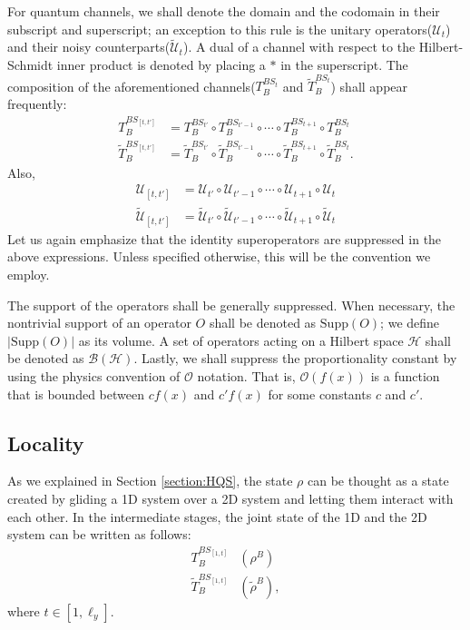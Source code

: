 \documentclass[prx,aps,amsmath,amssymb,floatfix,superscriptaddress,11pt,tightenlines,longbibliography,onecolumn,notitlepage]{revtex4-1}
\newcommand{\tran}[1]{T_{B}^{BS_{#1}}}
\newcommand{\trant}[2]{T_{B}^{BS_{[#1 , #2]}}}
\newcommand{\ttran}[1]{\tilde{T}_{B}^{BS_{#1}}}
\newcommand{\ttrant}[2]{\tilde{T}_{B}^{BS_{[#1 , #2]}}}
\newcommand{\U}[2]{\mathcal{U}_{[#1, #2]}}
\newcommand{\tU}[2]{\tilde{\mathcal{U}}_{[#1, #2]}}
\begin{document}
For quantum channels, we shall denote the domain and the codomain in their subscript and superscript; an exception to this rule is the unitary operators($\mathcal{U}_t$) and their noisy counterparts($\tilde{\mathcal{U}}_t$). A dual of a channel with respect to the Hilbert-Schmidt inner product is denoted by placing a $*$ in the superscript. The composition of the aforementioned channels($T_B^{BS_t}$ and $\tilde{T}_B^{BS_t}$) shall appear frequently:
\begin{equation}
  \begin{aligned}
    \trant{t}{t'} &=  \tran{t'} \circ \tran{t'-1} \circ \cdots \circ\tran{t+1} \circ \tran{t} \\
    \ttrant{t}{t'} &=  \ttran{t'} \circ \ttran{t'-1} \circ \cdots \circ\ttran{t+1} \circ \ttran{t}.
  \end{aligned}
\end{equation}
 Also,
\begin{equation}
  \begin{aligned}
    \U{t}{t'} &= \mathcal{U}_{t'} \circ \mathcal{U}_{t'-1} \circ \cdots \circ \mathcal{U}_{t+1} \circ \mathcal{U}_{t} \\
     \tU{t}{t'} &= \tilde{\mathcal{U}}_{t'} \circ \tilde{\mathcal{U}}_{t'-1} \circ \cdots \circ \tilde{\mathcal{U}}_{t+1} \circ \tilde{\mathcal{U}}_{t}
  \end{aligned}
\end{equation}
Let us again emphasize that the identity superoperators are suppressed in the above expressions. Unless specified otherwise, this will be the convention we employ.


The support of the operators shall be generally suppressed. When necessary, the nontrivial support of an operator $O$ shall be denoted as $\text{Supp}(O)$; we define $|\text{Supp}(O)|$ as its volume. A set of operators acting on a Hilbert space $\mathcal{H}$ shall be denoted as $\mathcal{B}(\mathcal{H})$. Lastly, we shall suppress the proportionality constant by using the physics convention of $\mathcal{O}$ notation. That is, $\mathcal{O}(f(x))$ is a function that is bounded between $cf(x)$ and $c'f(x)$ for some constants $c$ and $c'$.

\subsection{Locality \label{section:locality}}
As we explained in Section \ref{section:HQS}, the state $\rho$ can be thought as a state created by  gliding a 1D system over a 2D system and letting them interact with each other. In the intermediate stages, the joint state of the 1D and the 2D system can be written as follows:
\begin{equation}
  \begin{aligned}
    \trant{1}{t}&(\rho^B) \\
    \ttrant{1}{t}&(\tilde{\rho}^B),
    \end{aligned}
\end{equation}
where $t\in [1,\ell_y]$.
\end{document}
